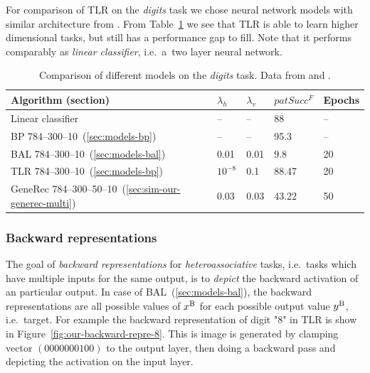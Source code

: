 For comparison of TLR on the \emph{digits} task we chose neural network models with similar architecture from \citet{digits2014mnist}. From Table~\ref{tab:results-cmp-digits} we see that TLR is able to learn higher dimensional tasks, but still has a performance gap to fill. Note that it performs comparably as \emph{linear classifier}, i.e.~a~two layer neural network. 

\begin{table}[H] 
  \centering
    \begin{tabular}{|l|l|l|l|l|}
    \hline
    Algorithm (section)&$\lambda_h$&$\lambda_v$&$patSucc^F$ &Epochs\\ %
    \hline
    Linear classifier & -- & -- & 88 & -- \\ 
    \hline
    BP 784--300--10~(\ref{sec:models-bp})& -- & -- & 95.3 & -- \\ 
    \hline 
    BAL 784--300--10~(\ref{sec:models-bal})& 0.01 & 0.01 & 9.8 & 20 \\
    \hline 
    TLR 784--300--10~(\ref{sec:models-bp})& $10^{-8}$ & 0.1 & 88.47 & 20 \\
    \hline 
    GeneRec 784--300--50--10~(\ref{sec:sim-our-generec-multi})& 0.03 & 0.03 & 43.22 & 50 \\
    \hline 
    \end{tabular}
  \caption{Comparison of different models on the \emph{digits} task. Data from \citet{lecun1998gradient} and \citet{digits2014mnist}.} 
  \label{tab:results-cmp-digits}
\end{table}

\subsubsection{Backward representations} 
\label{sec:our-backward-repre}

The goal of \emph{backward representations} for \emph{heteroassociative} tasks, i.e.~tasks which have multiple inputs for the same output, is to \emph{depict} the backward activation of an particular output. In case of BAL~(\ref{sec:models-bal}), the backward representations are all possible values of $x^{\rm B}$ for each possible output value $y^{\rm B}$, i.e.~target. For example the backward representation of digit "8" in TLR is show in Figure~\ref{fig:our-backward-repre-8}. This is image is generated by clamping vector $(0000000100)$ to the output layer, then doing a backward pass and depicting the activation on the input layer. 

